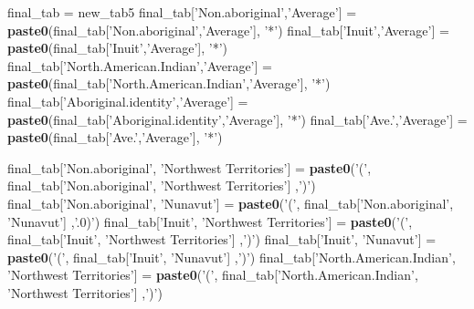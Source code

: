 \documentclass[9pt,letter]{article}
\newenvironment{Shaded}{\begin{snugshade}}{\end{snugshade}}
\newcommand{\KeywordTok}[1]{\textcolor[rgb]{0.13,0.29,0.53}{\textbf{#1}}}
\newcommand{\StringTok}[1]{\textcolor[rgb]{0.31,0.60,0.02}{#1}}
\newcommand{\NormalTok}[1]{#1}
\begin{document}
\begin{Shaded}
\begin{Highlighting}[]
\NormalTok{final_tab =}\StringTok{ }\NormalTok{new_tab5}
\NormalTok{final_tab[}\StringTok{'Non.aboriginal'}\NormalTok{,}\StringTok{'Average'}\NormalTok{] =}\StringTok{ }
\StringTok{  }\KeywordTok{paste0}\NormalTok{(final_tab[}\StringTok{'Non.aboriginal'}\NormalTok{,}\StringTok{'Average'}\NormalTok{], }\StringTok{'*'}\NormalTok{)}
\NormalTok{final_tab[}\StringTok{'Inuit'}\NormalTok{,}\StringTok{'Average'}\NormalTok{] =}\StringTok{ }
\StringTok{  }\KeywordTok{paste0}\NormalTok{(final_tab[}\StringTok{'Inuit'}\NormalTok{,}\StringTok{'Average'}\NormalTok{], }\StringTok{'*'}\NormalTok{)}
\NormalTok{final_tab[}\StringTok{'North.American.Indian'}\NormalTok{,}\StringTok{'Average'}\NormalTok{] =}\StringTok{ }
\StringTok{  }\KeywordTok{paste0}\NormalTok{(final_tab[}\StringTok{'North.American.Indian'}\NormalTok{,}\StringTok{'Average'}\NormalTok{], }\StringTok{'*'}\NormalTok{)}
\NormalTok{final_tab[}\StringTok{'Aboriginal.identity'}\NormalTok{,}\StringTok{'Average'}\NormalTok{] =}\StringTok{ }
\StringTok{  }\KeywordTok{paste0}\NormalTok{(final_tab[}\StringTok{'Aboriginal.identity'}\NormalTok{,}\StringTok{'Average'}\NormalTok{], }\StringTok{'*'}\NormalTok{)}
\NormalTok{final_tab[}\StringTok{'Ave.'}\NormalTok{,}\StringTok{'Average'}\NormalTok{] =}\StringTok{ }
\StringTok{  }\KeywordTok{paste0}\NormalTok{(final_tab[}\StringTok{'Ave.'}\NormalTok{,}\StringTok{'Average'}\NormalTok{], }\StringTok{'*'}\NormalTok{)}

\NormalTok{final_tab[}\StringTok{'Non.aboriginal'}\NormalTok{, }\StringTok{'Northwest Territories'}\NormalTok{] =}\StringTok{ }
\StringTok{  }\KeywordTok{paste0}\NormalTok{(}\StringTok{'('}\NormalTok{, final_tab[}\StringTok{'Non.aboriginal'}\NormalTok{, }\StringTok{'Northwest Territories'}\NormalTok{] ,}\StringTok{')'}\NormalTok{)}
\NormalTok{final_tab[}\StringTok{'Non.aboriginal'}\NormalTok{, }\StringTok{'Nunavut'}\NormalTok{] =}\StringTok{ }
\StringTok{  }\KeywordTok{paste0}\NormalTok{(}\StringTok{'('}\NormalTok{, final_tab[}\StringTok{'Non.aboriginal'}\NormalTok{, }\StringTok{'Nunavut'}\NormalTok{] ,}\StringTok{'.0)'}\NormalTok{)}
\NormalTok{final_tab[}\StringTok{'Inuit'}\NormalTok{, }\StringTok{'Northwest Territories'}\NormalTok{] =}\StringTok{ }
\StringTok{  }\KeywordTok{paste0}\NormalTok{(}\StringTok{'('}\NormalTok{, final_tab[}\StringTok{'Inuit'}\NormalTok{, }\StringTok{'Northwest Territories'}\NormalTok{] ,}\StringTok{')'}\NormalTok{)}
\NormalTok{final_tab[}\StringTok{'Inuit'}\NormalTok{, }\StringTok{'Nunavut'}\NormalTok{] =}\StringTok{ }
\StringTok{  }\KeywordTok{paste0}\NormalTok{(}\StringTok{'('}\NormalTok{, final_tab[}\StringTok{'Inuit'}\NormalTok{, }\StringTok{'Nunavut'}\NormalTok{] ,}\StringTok{')'}\NormalTok{)}
\NormalTok{final_tab[}\StringTok{'North.American.Indian'}\NormalTok{, }\StringTok{'Northwest Territories'}\NormalTok{] =}\StringTok{ }
\StringTok{  }\KeywordTok{paste0}\NormalTok{(}\StringTok{'('}\NormalTok{, final_tab[}\StringTok{'North.American.Indian'}\NormalTok{, }\StringTok{'Northwest Territories'}\NormalTok{] ,}\StringTok{')'}\NormalTok{)}


\end{Highlighting}
\end{Shaded}
\end{document}
